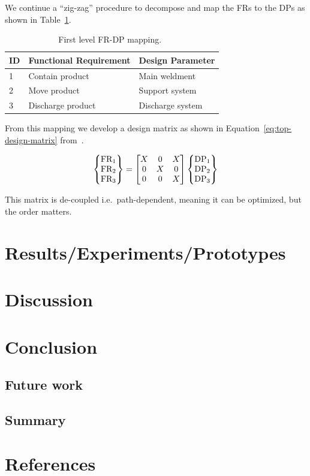 \documentclass[sn-mathphys,pdflatex]{sn-jnl}%
\theoremstyle{thmstyleone}%
\theoremstyle{thmstyletwo}%
\theoremstyle{thmstylethree}%
\begin{document}
We continue a ``zig-zag'' procedure to decompose and map the FRs to the DPs as shown in Table~\ref{tab:first_level-frdp}.

\begin{table}
  \center
  \caption{First level FR-DP mapping.~\cite{gerhard2016suretrack}}\label{tab:first_level-frdp}
  \begin{tabular}{lll} \toprule
    ID& Functional Requirement & Design Parameter \\ \midrule 
    1&Contain product&Main weldment\\
    2&Move product&Support system\\
    3&Discharge product &Discharge system\\
    \bottomrule
  \end{tabular}
\end{table}

From this mapping we develop a design matrix as shown in Equation~\ref{eq:top-design-matrix} from~\cite{gerhard2016suretrack}.

\begin{equation}\label{eq:top-design-matrix}
\begin{Bmatrix}
\text{FR}_{1}\\
\text{FR}_{2}\\
\text{FR}_{3}
\end{Bmatrix}=
\begin{bmatrix}
X &  0 & X\\
0 &  X & 0\\
0 &  0 & X
\end{bmatrix}
\begin{Bmatrix}
\text{DP}_{1}\\
\text{DP}_{2}\\
\text{DP}_{3}
\end{Bmatrix}
\end{equation}

This matrix is de-coupled i.e.\ path-dependent, meaning it can be optimized, but the order matters.

\section{Results/Experiments/Prototypes}\label{sec:rep}

\section{Discussion}\label{sec:results-discussion}

\section{Conclusion}\label{sec:conclusion}

\subsection{Future work}\label{sec:future-work}

\subsection{Summary}\label{sec:summary}

\section*{References}\label{sec:references}

\end{document}
